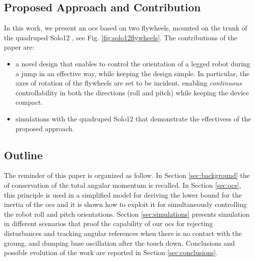 \documentclass[letterpaper, 10 pt, conference]{ieeeconf}  %
\begin{document}
\subsection{Proposed Approach and Contribution}
In this work, we present an \gls{ocs} based on two flywheels,  mounted on the trunk of the quadruped Solo12 \cite{grimminger2020open}, see Fig. \ref{fig:solo12flywheels}. 
The contributions of the paper are:
\begin{itemize}
	\item a novel design that enables to control the orientation of a legged robot during a jump in an effective way, while keeping the design simple. 
	In particular,  the axes of rotation of the flywheels are set to be incident, enabling \textit{continuous} controllability in both the directions (roll and pitch) while keeping the  device compact.
	\item simulations  with the quadruped Solo12 that demonstrate the effectivess of the proposed approach.
\end{itemize}



\subsection{Outline}
The reminder of this paper is organized as follow. In Section \ref{sec:background} the of conservation of the total angular momentum is recalled. In Section \ref{sec:ocs}, this principle is used in a simplified model for deriving the lower bound for the inertia of the \gls{ocs} and it is shown how to exploit it for simultaneously controlling the robot roll and pitch orientations. Section \ref{sec:simulations} presents simulation in different scenarios that proof the capability of our \gls{ocs} for rejecting disturbances and tracking angular references when there is no contact with the groung, and dumping base oscillation after the touch down. Conclusions and possible evolution of the work are reported in Section \ref{sec:conclusions}.
% 
\end{document}
